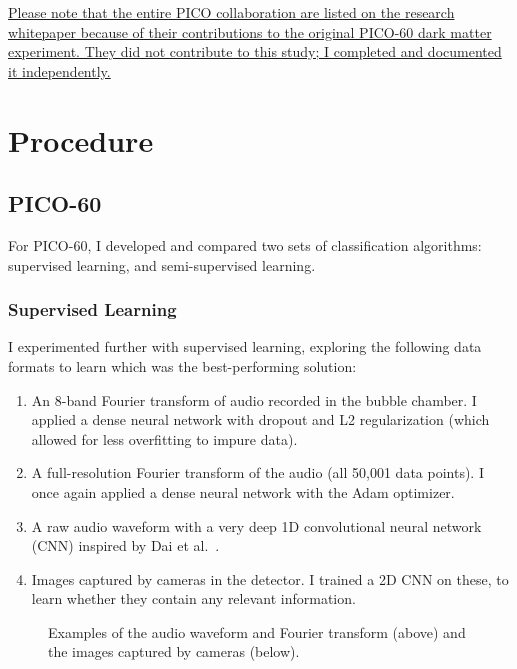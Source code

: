 \documentclass[12pt]{article}
\begin{document}
\ul{Please note that the entire PICO collaboration are listed on the research whitepaper because of their contributions to the original PICO-60 dark matter experiment. They did not contribute to this study; I completed and documented it independently.}

\section{Procedure}

\subsection{PICO-60}

For PICO-60, I developed and compared two sets of classification algorithms: supervised learning, and semi-supervised learning.

\subsubsection{Supervised Learning}

I experimented further with supervised learning, exploring the following data formats to learn which was the best-performing solution:

\begin{enumerate}
    \item An 8-band Fourier transform of audio recorded in the bubble chamber. I applied a dense neural network with dropout \cite{dropout} and L2 regularization (which allowed for less overfitting to impure data).
    \item A full-resolution Fourier transform of the audio (all 50,001 data points). I once again applied a dense neural network with the Adam \cite{adam} optimizer.
    \item A raw audio waveform with a very deep 1D convolutional neural network (CNN) inspired by Dai et al.\ \cite{verydeepconvnets}.
    \item Images captured by cameras in the detector. I trained a 2D CNN on these, to learn whether they contain any relevant information.
\end{enumerate}

\begin{figure}[ht]
    \centering
    \qquad
    \caption{Examples of the audio waveform and Fourier transform (above) and the images captured by cameras (below).}
\end{figure}
\end{document}

